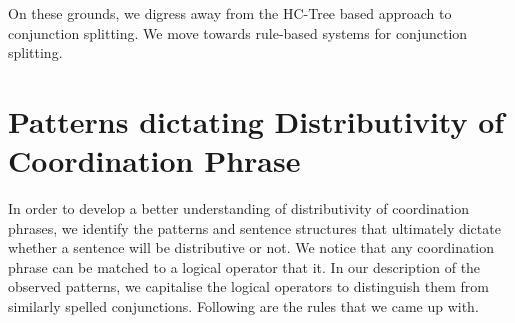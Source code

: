         On these grounds, we digress away from the HC-Tree based approach to conjunction splitting. We move towards rule-based systems for conjunction splitting.

\section{Patterns dictating Distributivity of Coordination Phrase}

    In order to develop a better understanding of distributivity of coordination phrases, we identify the patterns and sentence structures that ultimately dictate whether a sentence will be distributive or not. We notice that any coordination phrase can be matched to a logical operator that it. In our description of the observed patterns, we capitalise the logical operators to distinguish them from similarly spelled conjunctions. Following are the rules that we came up with.
